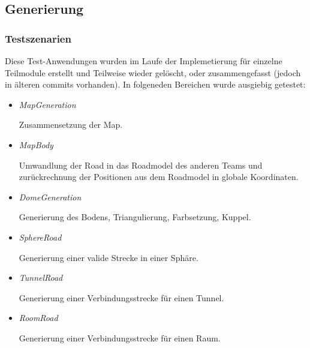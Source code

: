 \subsection{Generierung}

\subsubsection{Testszenarien}

Diese Test-Anwendungen wurden im Laufe der Implemetierung für einzelne Teilmodule
erstellt und Teilweise wieder gelöscht, oder zusammengefasst (jedoch in älteren commits vorhanden).
In folgeneden Bereichen wurde ausgiebig getestet:

\begin{itemize}
    \item \textit{MapGeneration}
        \begin{leftbar}[0.9\linewidth]
            Zusammensetzung der Map.
        \end{leftbar}
\end{itemize}
\begin{itemize}
    \item \textit{MapBody}
        \begin{leftbar}[0.9\linewidth]
            Umwandlung der Road in das Roadmodel des anderen Teams und zurückrechnung der
            Positionen aus dem Roadmodel in globale Koordinaten.
        \end{leftbar}
\end{itemize}
\begin{itemize}
    \item \textit{DomeGeneration}
        \begin{leftbar}[0.9\linewidth]
            Generierung des Bodens, Triangulierung, Farbsetzung, Kuppel.
        \end{leftbar}
\end{itemize}
\begin{itemize}
    \item \textit{SphereRoad}
        \begin{leftbar}[0.9\linewidth]
            Generierung einer valide Strecke in einer Sphäre.
        \end{leftbar}
\end{itemize}
\begin{itemize}
    \item \textit{TunnelRoad}
        \begin{leftbar}[0.9\linewidth]
            Generierung einer Verbindungsstrecke für einen Tunnel.
        \end{leftbar}
\end{itemize}
\begin{itemize}
    \item \textit{RoomRoad}
        \begin{leftbar}[0.9\linewidth]
            Generierung einer Verbindungsstrecke für einen Raum.
        \end{leftbar}
\end{itemize}